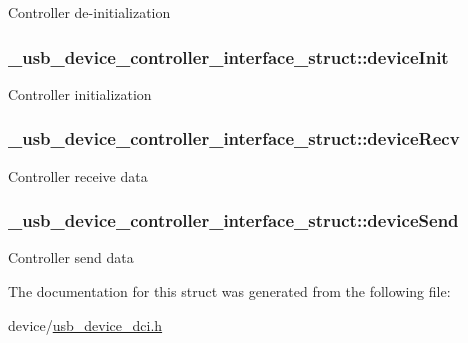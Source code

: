 Controller de-\/initialization \hypertarget{struct__usb__device__controller__interface__struct_a2a8addd32dd6a3cb66f01f6912585ae1}{
\subsubsection[{device\-Init}]{ \-\_\-usb\-\_\-device\-\_\-controller\-\_\-interface\-\_\-struct\-::device\-Init}}\label{struct__usb__device__controller__interface__struct_a2a8addd32dd6a3cb66f01f6912585ae1}
Controller initialization \hypertarget{struct__usb__device__controller__interface__struct_ac58934254b0e4122309de852bc1399c4}{
\subsubsection[{device\-Recv}]{ \-\_\-usb\-\_\-device\-\_\-controller\-\_\-interface\-\_\-struct\-::device\-Recv}}\label{struct__usb__device__controller__interface__struct_ac58934254b0e4122309de852bc1399c4}
Controller receive data \hypertarget{struct__usb__device__controller__interface__struct_a316b3b4a883b7e9f4007e30f28a463ff}{
\subsubsection[{device\-Send}]{ \-\_\-usb\-\_\-device\-\_\-controller\-\_\-interface\-\_\-struct\-::device\-Send}}\label{struct__usb__device__controller__interface__struct_a316b3b4a883b7e9f4007e30f28a463ff}
Controller send data 

The documentation for this struct was generated from the following file\-:\begin{DoxyCompactItemize}
\item 
device/\hyperlink{usb__device__dci_8h}{usb\-\_\-device\-\_\-dci.\-h}\end{DoxyCompactItemize}
